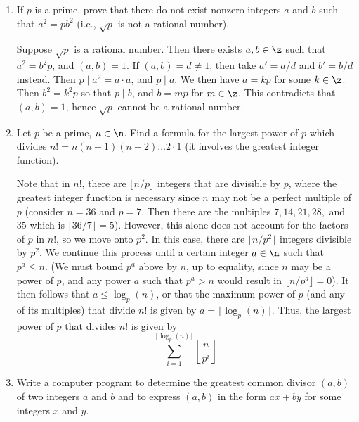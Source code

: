 \begin{enumerate}
\begin{sol}
    \end{sol}
    \item If $p$ is a prime, prove that there do not exist nonzero integers $a$ and $b$ such that $a^2 = pb^2$ (i.e., $\sqrt p$ is not a rational number).
    \begin{sol}
        Suppose $\sqrt p$ is a rational number. Then there exists $a, b \in \z$ such that $a^2 = b^2p$, and $(a, b) = 1$. If $(a, b) = d \neq 1$, then take $a' = a/d$ and $b' = b/d$ instead. Then $p \mid a^2 = a \cdot a$, and $p \mid a$. We then have $a = kp$ for some $k \in \z$. Then $b^2 = k^2p$ so that $p \mid b$, and $b = mp$ for $m \in \z$. This contradicts that $(a, b) = 1$, hence $\sqrt p$ cannot be a rational number.
    \end{sol}
    \item Let $p$ be a prime, $n \in \n$. Find a formula for the largest power of $p$ which divides $n! = n(n - 1)(n - 2) \ldots 2 \cdot 1$ (it involves the greatest integer function).
    \label{ex0.2.8}
    \begin{sol}
        Note that in $n!$, there are $\lfloor n/p \rfloor$ integers that are divisible by $p$, where the greatest integer function is necessary since $n$ may not be a perfect multiple of $p$ (consider $n = 36$ and $p = 7$. Then there are the multiples $7, 14, 21, 28,$ and $35$ which is $\lfloor 36/7 \rfloor = 5$). However, this alone does not account for the factors of $p$ in $n!$, so we move onto $p^2$. In this case, there are $\lfloor n/p^2 \rfloor$ integers divisible by $p^2$. We continue this process until a certain integer $a \in \n$ such that $p^a \leq n$. (We must bound $p^a$ above by $n$, up to equality, since $n$ may be a power of $p$, and any power $a$ such that $p^a > n$ would result in $\lfloor n/p^a\rfloor= 0$). It then follows that $a \leq \log_p(n)$, or that the maximum power of $p$ (and any of its multiples) that divide $n!$ is given by $a = \lfloor\log_p(n)\rfloor$. Thus, the largest power of $p$ that divides $n!$ is given by
        $$\sum_{i = 1}^{\lfloor \log_p(n)\rfloor} \left\lfloor\frac{n}{p^i}\right\rfloor$$
    \end{sol}
    \item Write a computer program to determine the greatest common divisor $(a, b)$ of two integers $a$ and $b$ and to express $(a, b)$ in the form $ax + by$ for some integers $x$ and $y$.
    \begin{breakablealgorithm}
        \begin{algorithmic}[1]
            

\end{algorithmic}
\end{breakablealgorithm}
\end{enumerate}
